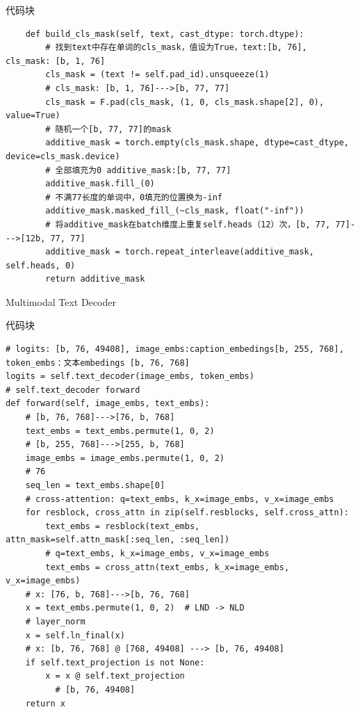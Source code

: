 \documentclass[zihao=false,fontset=windows]{ctexart}
\newcommand{\codehead}{{\small\ttfamily\color{feishuGray}代码块}\par\vspace{-0.15em}}
\begin{document}
\begin{feishucode}
\codehead
\begin{lstlisting}
    def build_cls_mask(self, text, cast_dtype: torch.dtype):
        # 找到text中存在单词的cls_mask，值设为True，text:[b, 76], cls_mask: [b, 1, 76]
        cls_mask = (text != self.pad_id).unsqueeze(1)
        # cls_mask: [b, 1, 76]--->[b, 77, 77]
        cls_mask = F.pad(cls_mask, (1, 0, cls_mask.shape[2], 0), value=True)
        # 随机一个[b, 77, 77]的mask
        additive_mask = torch.empty(cls_mask.shape, dtype=cast_dtype, device=cls_mask.device)
        # 全部填充为0 additive_mask:[b, 77, 77]
        additive_mask.fill_(0)
        # 不满77长度的单词中，0填充的位置换为-inf
        additive_mask.masked_fill_(~cls_mask, float("-inf"))
        # 将additive_mask在batch维度上重复self.heads（12）次，[b, 77, 77]--->[12b, 77, 77]
        additive_mask = torch.repeat_interleave(additive_mask, self.heads, 0)
        return additive_mask
\end{lstlisting}
\end{feishucode}

Multimodal Text Decoder\par
\begin{feishucode}
\codehead
\begin{lstlisting}
# logits: [b, 76, 49408], image_embs:caption_embedings[b, 255, 768], token_embs：文本embedings [b, 76, 768]
logits = self.text_decoder(image_embs, token_embs)
# self.text_decoder forward
def forward(self, image_embs, text_embs):
    # [b, 76, 768]--->[76, b, 768]
    text_embs = text_embs.permute(1, 0, 2)
    # [b, 255, 768]--->[255, b, 768]
    image_embs = image_embs.permute(1, 0, 2)
    # 76
    seq_len = text_embs.shape[0]
    # cross-attention: q=text_embs, k_x=image_embs, v_x=image_embs
    for resblock, cross_attn in zip(self.resblocks, self.cross_attn):
        text_embs = resblock(text_embs, attn_mask=self.attn_mask[:seq_len, :seq_len])
        # q=text_embs, k_x=image_embs, v_x=image_embs
        text_embs = cross_attn(text_embs, k_x=image_embs, v_x=image_embs)
    # x: [76, b, 768]--->[b, 76, 768]
    x = text_embs.permute(1, 0, 2)  # LND -> NLD
    # layer_norm
    x = self.ln_final(x)
    # x: [b, 76, 768] @ [768, 49408] ---> [b, 76, 49408]
    if self.text_projection is not None:
        x = x @ self.text_projection
          # [b, 76, 49408]
    return x
\end{lstlisting}
\end{feishucode}
\end{document}
